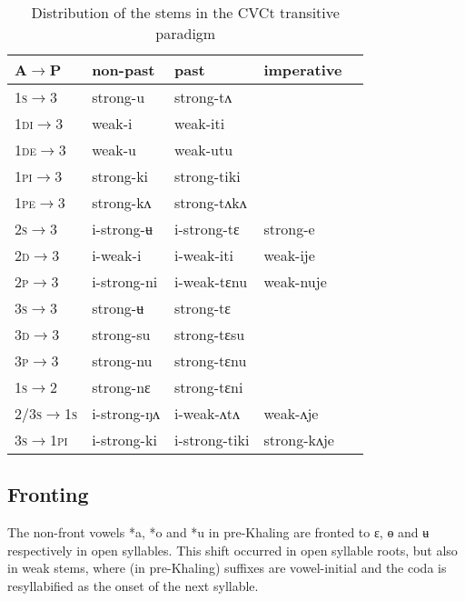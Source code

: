 \documentclass[oldfontcommands,oneside,a4paper,11pt]{article}
\newcommand{\ipa}[1]{{\phon \mbox{#1}}} %
\newcommand{\grise}[1]{\cellcolor{lightgray}\textbf{#1}}
\begin{document}
\begin{table}[H]
\caption{Distribution of the stems in the CVCt transitive paradigm } \label{tab:trans.cvct.paradigm} \centering
\begin{tabular}{lllll}
\toprule
A$\rightarrow$P& non-past & past &imperative\\
\midrule
\textsc{1s}$\rightarrow$3 & strong-\ipa{u}\grise{}  & strong-\ipa{tʌ} \\
\textsc{1di}$\rightarrow$3 & weak-\ipa{i} & weak-\ipa{iti} \\
\textsc{1de}$\rightarrow$3 & weak-\ipa{u} & weak-\ipa{utu} \\
\textsc{1pi}$\rightarrow$3 & strong-\ipa{ki} & strong-\ipa{tiki} \\
\textsc{1pe}$\rightarrow$3 & strong-\ipa{kʌ} & strong-\ipa{tʌkʌ} \\
\textsc{2s}$\rightarrow$3 & \ipa{i}-strong-\ipa{ʉ} \grise{} & \ipa{i}-strong-\ipa{tɛ}  &strong-\ipa{e} \grise{} \\
\textsc{2d}$\rightarrow$3 & \ipa{i}-weak-\ipa{i} & \ipa{i}-weak-\ipa{iti} &weak-\ipa{ije}\\
\textsc{2p}$\rightarrow$3 & \ipa{i}-strong-\ipa{ni} & \ipa{i}-weak-\ipa{tɛnu}\grise{} &weak-\ipa{nuje}\grise{}\\
\textsc{3s}$\rightarrow$3 & strong-\ipa{ʉ} \grise{} & strong-\ipa{tɛ}\\
\textsc{3d}$\rightarrow$3 & strong-\ipa{su} & strong-\ipa{tɛsu}   \\
\textsc{3p}$\rightarrow$3 & strong-\ipa{nu} & strong-\ipa{tɛnu}\\
\midrule
\textsc{1s}$\rightarrow$2 & strong-\ipa{nɛ} & strong-\ipa{tɛni}\\
\textsc{2/3s$\rightarrow$1s} & \ipa{i}-strong-\ipa{ŋʌ} & \ipa{i}-weak-\ipa{ʌtʌ} & weak-\ipa{ʌje}\\
\textsc{3s$\rightarrow$1pi} & \ipa{i}-strong-\ipa{ki} & \ipa{i}-strong-\ipa{tiki} & strong-\ipa{kʌje}\\
\bottomrule
\end{tabular}
\end{table}



\subsection{Fronting} \label{sec:fronting}
The non-front vowels \ipa{*a}, \ipa{*o} and \ipa{*u} in pre-Khaling are fronted to \ipa{ɛ}, \ipa{ɵ} and \ipa{ʉ} respectively in open syllables. This shift occurred in   open syllable roots, but also in weak stems, where (in pre-Khaling) suffixes are vowel-initial and the coda is resyllabified as the onset of the next syllable. 
\end{document}
